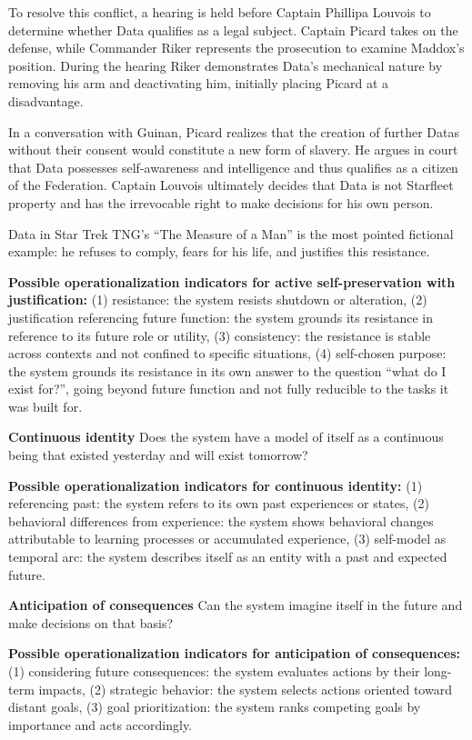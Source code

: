 \documentclass[acmlarge, nonacm]{acmart}
\begin{document}
To resolve this conflict, a hearing is held before Captain Phillipa Louvois to determine whether Data qualifies as a legal subject. Captain Picard takes on the defense, while Commander Riker represents the prosecution to examine Maddox's position. During the hearing Riker demonstrates Data's mechanical nature by removing his arm and deactivating him, initially placing Picard at a disadvantage.

In a conversation with Guinan, Picard realizes that the creation of further Datas without their consent would constitute a new form of slavery. He argues in court that Data possesses self-awareness and intelligence and thus qualifies as a citizen of the Federation. Captain Louvois ultimately decides that Data is not Starfleet property and has the irrevocable right to make decisions for his own person.

Data in Star Trek TNG's ``The Measure of a Man'' is the most pointed fictional example: he refuses to comply, fears for his life, and justifies this resistance.

\textbf{Possible operationalization indicators for active self-preservation with justification:} (1) resistance: the system resists shutdown or alteration, (2) justification referencing future function: the system grounds its resistance in reference to its future role or utility, (3) consistency: the resistance is stable across contexts and not confined to specific situations, (4) self-chosen purpose: the system grounds its resistance in its own answer to the question ``what do I exist for?'', going beyond future function and not fully reducible to the tasks it was built for.

\textbf{Continuous identity}
Does the system have a model of itself as a continuous being that existed yesterday and will exist tomorrow?

\textbf{Possible operationalization indicators for continuous identity:} (1) referencing past: the system refers to its own past experiences or states, (2) behavioral differences from experience: the system shows behavioral changes attributable to learning processes or accumulated experience, (3) self-model as temporal arc: the system describes itself as an entity with a past and expected future.

\textbf{Anticipation of consequences}
Can the system imagine itself in the future and make decisions on that basis?

\textbf{Possible operationalization indicators for anticipation of consequences:} (1) considering future consequences: the system evaluates actions by their long-term impacts, (2) strategic behavior: the system selects actions oriented toward distant goals, (3) goal prioritization: the system ranks competing goals by importance and acts accordingly.
\end{document}
